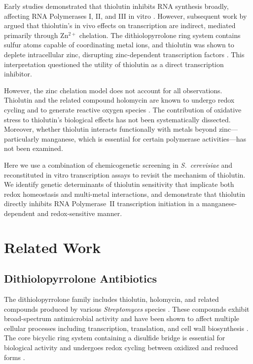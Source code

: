 \documentclass[11pt]{article}
\begin{document}
Early studies demonstrated that thiolutin inhibits RNA synthesis broadly, affecting RNA Polymerases I, II, and III in vitro \citep{tipper1973,khachatourians1975}. However, subsequent work by \citet{lauinger2017} argued that thiolutin's in vivo effects on transcription are indirect, mediated primarily through Zn$^{2+}$ chelation. The dithiolopyrrolone ring system contains sulfur atoms capable of coordinating metal ions, and thiolutin was shown to deplete intracellular zinc, disrupting zinc-dependent transcription factors \citep{lauinger2017}. This interpretation questioned the utility of thiolutin as a direct transcription inhibitor.

However, the zinc chelation model does not account for all observations. Thiolutin and the related compound holomycin are known to undergo redox cycling and to generate reactive oxygen species \citep{oliva2001,li2007}. The contribution of oxidative stress to thiolutin's biological effects has not been systematically dissected. Moreover, whether thiolutin interacts functionally with metals beyond zinc---particularly manganese, which is essential for certain polymerase activities---has not been examined.

Here we use a combination of chemicogenetic screening in \textit{S.~cerevisiae} and reconstituted in vitro transcription assays to revisit the mechanism of thiolutin. We identify genetic determinants of thiolutin sensitivity that implicate both redox homeostasis and multi-metal interactions, and demonstrate that thiolutin directly inhibits RNA Polymerase~II transcription initiation in a manganese-dependent and redox-sensitive manner.

\section{Related Work}

\subsection{Dithiolopyrrolone Antibiotics}

The dithiolopyrrolone family includes thiolutin, holomycin, and related compounds produced by various \textit{Streptomyces} species \citep{celmer1952,kenig1979}. These compounds exhibit broad-spectrum antimicrobial activity and have been shown to affect multiple cellular processes including transcription, translation, and cell wall biosynthesis \citep{oliva2001}. The core bicyclic ring system containing a disulfide bridge is essential for biological activity and undergoes redox cycling between oxidized and reduced forms \citep{li2007}.
\end{document}
